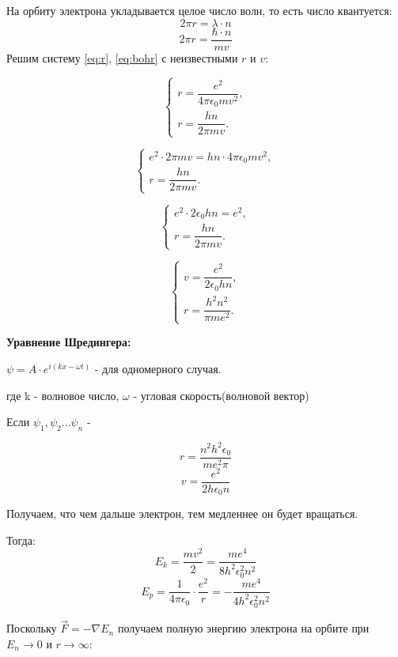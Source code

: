 \documentclass[../main.tex]{subfiles}
\begin{document}
На орбиту электрона укладывается целое число волн, то есть число квантуется: 
\[2 \pi r = \lambda \cdot n\]
\begin{equation} \label{eq:bohr}
    2 \pi r = \frac{\hbar \cdot n}{m v}
\end{equation}
Решим систему \eqref{eq:r}, \eqref{eq:bohr} с неизвестными $r$ и $v$:

\[
\begin{cases}
r = \dfrac{e^2}{4 \pi \epsilon_0 m v^2},\\[4pt]
r = \dfrac{h n}{2 \pi m v}.
\end{cases}
\]

\[
\begin{cases}
e^2 \cdot 2 \pi m v = h n \cdot 4 \pi \epsilon_0 m v^2,\\[4pt]
r = \dfrac{h n}{2 \pi m v}.
\end{cases}
\]

\[
\begin{cases}
e^2 \cdot 2 \epsilon_0 h n = e^2,\\[4pt]
r = \dfrac{h n}{2 \pi m v}.
\end{cases}
\]

\[
\begin{cases}
v = \dfrac{e^2}{2 \epsilon_0 h n},\\[4pt]
r = \dfrac{h^2 n^2}{\pi m e^2}.
\end{cases}
\]

\textbf{Уравнение Шредингера:}


\begin{center}
\(\displaystyle \psi = A \cdot e^{i(kx - \omega t)}\) - для одномерного случая.    
\end{center}



\begin{center}
    где k - волновое число, $\omega$ - угловая скорость(волновой вектор)
\end{center}
Если $\psi_1, \psi_2 \ldots \psi_n$ - 

\[r = \frac{n^2 h^2 \epsilon_0}{m e^2 \pi}\]
\[v = \frac{e^2}{2h \epsilon_0 n}\]

Получаем, что чем дальше электрон, тем медленнее он будет вращаться.

Тогда:
\[E_k = \frac{mv^2}{2} = \frac{me^4}{8h^2 \epsilon_0^2 n^2}\]
\[E_p = \frac{1}{4 \pi \epsilon_0} \cdot \frac{e^2}{r} = - \frac{m e^4}{4 h^2 \epsilon_0^2 n^2}\]

Поскольку $\vec F = - \nabla E_n$ получаем полную энергию электрона на орбите при $E_n \to 0$ и $r \to \infty$:
\end{document}
